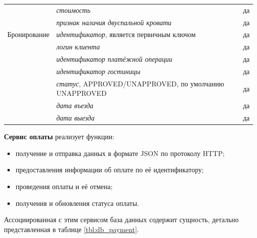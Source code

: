 \begin{longtable}{| p{3cm} | p{9.3cm} | p{3.6cm} |}
	&
	\textit{стоимость}
	&
	да \\
	\cline{2-3}
	
	&
	\textit{признак наличия двуспальной кровати}
	&
	да \\
	\hline
	
	\multirow{1}{*}{Бронирование}
	& 
	\textit{идентификатор}, является первичным ключом
	& 
	да \\
	\cline{2-3}
	
	&
	\textit{логин клиента}
	&
	да \\
	\cline{2-3}
	
	&
	\textit{идентификатор платёжной операции}
	&
	да \\
	\cline{2-3}
	
	&
	\textit{идентификатор гостиницы}
	&
	да \\
	\cline{2-3}
	
	&
	\textit{статус}, APPROVED/UNAPPROVED, по умолчанию UNAPPROVED
	&
	да \\
	\cline{2-3}
	
	&
	\textit{дата въезда}
	&
	да \\
	\cline{2-3}
	
	&
	\textit{дата выезда}
	&
	да \\
	\cline{2-3}
\end{longtable}
\textbf{Сервис оплаты} реализует функции:
\begin{itemize}
	\item получение и отправка данных в формате JSON по протоколу HTTP;
	
	\item предоставления информации об оплате по её идентификатору;
	
	\item проведения оплаты и её отмена;
	
	\item получения и обновления статуса оплаты.
\end{itemize}
Ассоциированная с этим сервисом база данных содержит сущность, детально представленная в таблице \ref{tbl:db_payment}.
